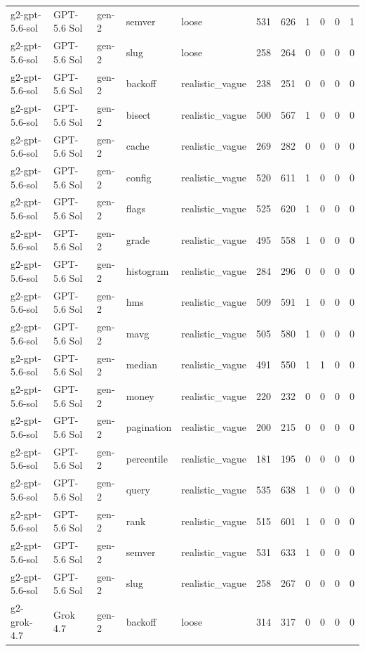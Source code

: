 \begin{tabular}{lllllllllll}
g2-gpt-5.6-sol & GPT-5.6 Sol & gen-2 & semver & loose & 531 & 626 & 1 & 0 & 0 & 1 \\
g2-gpt-5.6-sol & GPT-5.6 Sol & gen-2 & slug & loose & 258 & 264 & 0 & 0 & 0 & 0 \\
g2-gpt-5.6-sol & GPT-5.6 Sol & gen-2 & backoff & realistic\_vague & 238 & 251 & 0 & 0 & 0 & 0 \\
g2-gpt-5.6-sol & GPT-5.6 Sol & gen-2 & bisect & realistic\_vague & 500 & 567 & 1 & 0 & 0 & 0 \\
g2-gpt-5.6-sol & GPT-5.6 Sol & gen-2 & cache & realistic\_vague & 269 & 282 & 0 & 0 & 0 & 0 \\
g2-gpt-5.6-sol & GPT-5.6 Sol & gen-2 & config & realistic\_vague & 520 & 611 & 1 & 0 & 0 & 0 \\
g2-gpt-5.6-sol & GPT-5.6 Sol & gen-2 & flags & realistic\_vague & 525 & 620 & 1 & 0 & 0 & 0 \\
g2-gpt-5.6-sol & GPT-5.6 Sol & gen-2 & grade & realistic\_vague & 495 & 558 & 1 & 0 & 0 & 0 \\
g2-gpt-5.6-sol & GPT-5.6 Sol & gen-2 & histogram & realistic\_vague & 284 & 296 & 0 & 0 & 0 & 0 \\
g2-gpt-5.6-sol & GPT-5.6 Sol & gen-2 & hms & realistic\_vague & 509 & 591 & 1 & 0 & 0 & 0 \\
g2-gpt-5.6-sol & GPT-5.6 Sol & gen-2 & mavg & realistic\_vague & 505 & 580 & 1 & 0 & 0 & 0 \\
g2-gpt-5.6-sol & GPT-5.6 Sol & gen-2 & median & realistic\_vague & 491 & 550 & 1 & 1 & 0 & 0 \\
g2-gpt-5.6-sol & GPT-5.6 Sol & gen-2 & money & realistic\_vague & 220 & 232 & 0 & 0 & 0 & 0 \\
g2-gpt-5.6-sol & GPT-5.6 Sol & gen-2 & pagination & realistic\_vague & 200 & 215 & 0 & 0 & 0 & 0 \\
g2-gpt-5.6-sol & GPT-5.6 Sol & gen-2 & percentile & realistic\_vague & 181 & 195 & 0 & 0 & 0 & 0 \\
g2-gpt-5.6-sol & GPT-5.6 Sol & gen-2 & query & realistic\_vague & 535 & 638 & 1 & 0 & 0 & 0 \\
g2-gpt-5.6-sol & GPT-5.6 Sol & gen-2 & rank & realistic\_vague & 515 & 601 & 1 & 0 & 0 & 0 \\
g2-gpt-5.6-sol & GPT-5.6 Sol & gen-2 & semver & realistic\_vague & 531 & 633 & 1 & 0 & 0 & 0 \\
g2-gpt-5.6-sol & GPT-5.6 Sol & gen-2 & slug & realistic\_vague & 258 & 267 & 0 & 0 & 0 & 0 \\
g2-grok-4.7 & Grok 4.7 & gen-2 & backoff & loose & 314 & 317 & 0 & 0 & 0 & 0 \\

\end{tabular}
